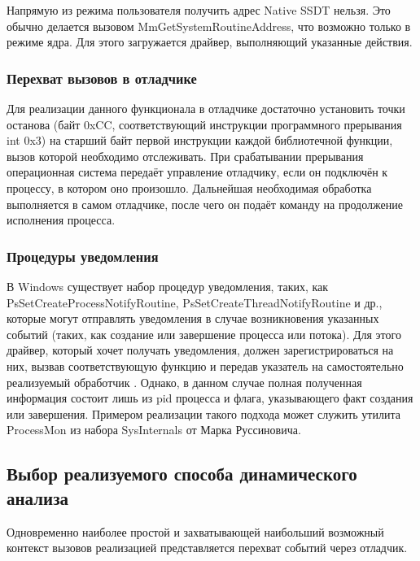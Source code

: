 Напрямую из режима пользователя получить адрес Native SSDT нельзя. Это обычно делается вызовом MmGetSystemRoutineAddress, что возможно только в режиме ядра. Для этого загружается драйвер, выполняющий указанные действия.
\subsubsection {Перехват вызовов в отладчике}
Для реализации данного функционала в отладчике достаточно установить точки останова (байт 0xCC, соответствующий инструкции программного прерывания int 0x3) на старший байт первой инструкции каждой библиотечной функции, вызов которой необходимо отслеживать. При срабатывании прерывания операционная система передаёт управление отладчику, если он подключён к процессу, в котором оно произошло. Дальнейшая необходимая обработка выполняется в самом отладчике, после чего он подаёт команду на продолжение исполнения процесса.
\subsubsection {Процедуры уведомления}
В Windows существует набор процедур уведомления, таких, как PsSetCreateProcessNotifyRoutine, PsSetCreateThreadNotifyRoutine и др., которые могут отправлять уведомления в случае возникновения указанных событий (таких, как создание или завершение процесса или потока). Для этого драйвер, который хочет получать уведомления, должен зарегистрироваться на них, вызвав соответствующую функцию и передав указатель на самостоятельно реализуемый обработчик . Однако, в данном случае полная полученная информация состоит лишь из pid процесса и флага, указывающего факт создания или завершения. Примером реализации такого подхода может служить утилита ProcessMon из набора SysInternals от Марка Руссиновича.
\subsection {Выбор реализуемого способа динамического анализа}
Одновременно наиболее простой и захватывающей наибольший возможный контекст вызовов реализацией представляется перехват событий через отладчик.

